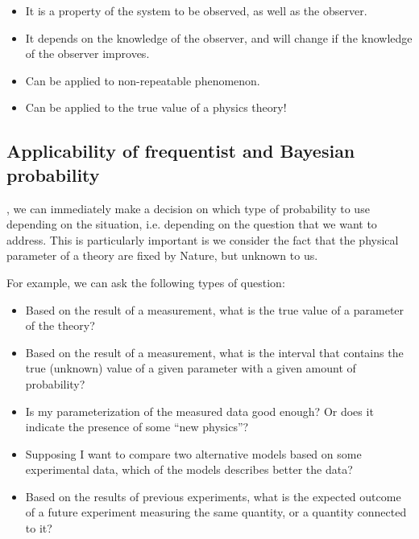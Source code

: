 \begin{itemize}
	\item It is a property of the system to be observed, as well as the observer.
	\item It depends on the knowledge of the observer, and will change if the knowledge of the observer improves.
	\item Can be applied to non-repeatable phenomenon.
	\item Can be applied to the true value of a physics theory!
\end{itemize}

\subsection{Applicability of frequentist and Bayesian probability}
\label{subsec:app_prob}

, we can immediately make a decision on which type of probability to use depending on the situation, i.e. depending on the question that we want to address. This is particularly important is we consider the fact that the physical parameter of a theory are fixed by Nature, but unknown to us.

For example, we can ask the following types of question:

\begin{itemize}[$\to$] 
	\item Based on the result of a measurement, what is the true value of a parameter of the theory?
	\item Based on the result of a measurement, what is the interval that contains the true (unknown) value of a given parameter with a given amount of probability?
	\item Is my parameterization of the measured data good enough? Or does it indicate the presence of some “new physics”?
	\item Supposing I want to compare two alternative models based on some experimental data, which of the models describes better the data?
	\item Based on the results of previous experiments, what is the expected outcome of a future experiment measuring the same quantity, or a quantity connected to it?
\end{itemize}
